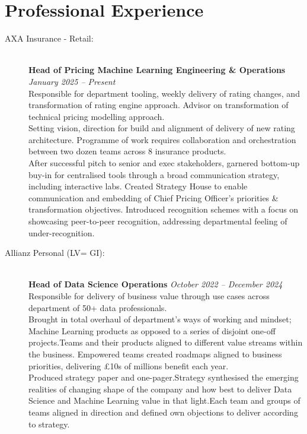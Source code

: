 \documentclass[11pt]{article}
\begin{document}
\section*{Professional Experience}
\begin{description}

\item[AXA Insurance - Retail:] \hspace{1mm}\\
\textbf{Head of Pricing Machine Learning Engineering \& Operations} \emph{January 2025 -- Present} \\
\textbullet \quad Responsible for department tooling, weekly delivery of rating changes, and transformation of rating engine approach. \quad Advisor on transformation of technical pricing modelling approach.\\
\textbullet \quad Setting vision, direction for build and alignment of delivery of new rating architecture. Programme of work requires collaboration and orchestration between two dozen teams across 8 insurance products. \\
\textbullet \quad After successful pitch to senior and exec stakeholders, garnered bottom-up buy-in for centralised tools through a broad communication strategy, including interactive labs. Created Strategy House to enable communication and embedding of Chief Pricing Officer's priorities \& transformation objectives. Introduced recognition schemes with a focus on showcasing peer-to-peer recognition, addressing departmental feeling of under-recognition.

\item[Allianz Personal (LV= GI):] \hspace{1mm}\\
\textbf{Head of Data Science Operations} \emph{October 2022 -- December 2024} \\
\textbullet \quad Responsible for delivery of business value through use cases across department of 50+ data professionals.\\
\textbullet \quad Brought in total overhaul of department's ways of working and mindset; Machine Learning products as opposed to a series of disjoint one-off projects.\quad Teams and their products aligned to different value streams within the business. Empowered teams created roadmaps aligned to business priorities, delivering £10s of millions benefit each year.\\
\textbullet \quad Produced strategy paper and one-pager.\quad Strategy synthesised the emerging realities of changing shape of the company and how best to deliver Data Science and Machine Learning value in that light.\quad Each team and groups of teams aligned in direction and defined own objections to deliver according to strategy.\\


\end{description}
\end{document}
